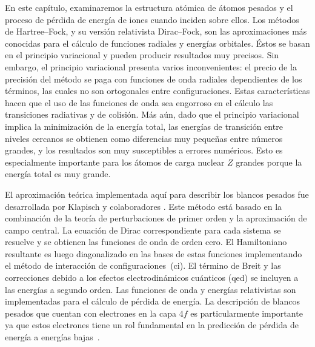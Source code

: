En este capítulo, examinaremos la estructura atómica de átomos pesados
y el proceso de pérdida de energía de iones cuando inciden sobre ellos.
Los métodos de Hartree--Fock, y su versión relativista Dirac--Fock, 
son las aproximaciones más conocidas para el cálculo de funciones 
radiales y energías orbitales. Éstos se basan en el principio 
variacional y pueden producir resultados muy precisos. Sin embargo, el 
principio variacional presenta varios inconvenientes: el precio de la 
precisión del método se paga con funciones de onda radiales dependientes 
de los términos, las cuales no son ortogonales entre configuraciones. 
Estas características hacen que el uso de las funciones de onda sea 
engorroso en el cálculo las transiciones radiativas y de colisión. Más 
aún, dado que el principio variacional implica la minimización de la 
energía total, las energías de transición entre niveles cercanos se 
obtienen como diferencias muy pequeñas entre números grandes, y los 
resultados son muy susceptibles a errores numéricos. Esto es 
especialmente importante para los átomos de carga nuclear $Z$ grandes 
porque la energía total es muy grande. 

El aproximación teórica implementada aquí para describir los blancos 
pesados fue desarrollada por Klapisch y colaboradores 
\cite{Klapisch:77,Koenig:72,Klapisch:71,Klapisch:67}. Este método
está basado en la combinación de la teoría de perturbaciones de primer 
orden y la aproximación de campo central. La ecuación de Dirac 
correspondiente para cada sistema se resuelve y se obtienen las 
funciones de onda de orden cero. El Hamiltoniano resultante es luego
diagonalizado en las bases de estas funciones implementando el método de
interacción de configuraciones~(\acs{ci}). El término de Breit y las 
correcciones debido a los efectos electrodinámicos cuánticos (\acs{qed}) 
se incluyen a las energías a segundo orden. Las funciones de onda y 
energías relativistas son implementadas para el cálculo de pérdida de 
energía. 
La descripción de blancos pesados que cuentan con electrones en la capa 
$4f$ es particularmente importante ya que estos electrones tiene un rol 
fundamental en la predicción de pérdida de energía a energías 
bajas~\cite{Roth:17}. 

